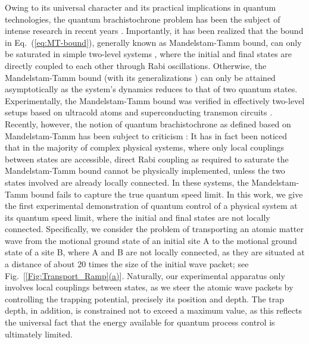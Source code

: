 \documentclass[aps,pra,reprint,a4paper,nofootinbib,superscriptaddress,numbers,longbibliography,showpacs,showkeys,floatfix]{revtex4-1}
\newcommand{\figref}[2]{\hyperref[#1]{\ref{#1}(#2)}} %
\newcommand{\MT}{Mandelstam-Tamm\xspace}
\begin{document}
Owing to its universal character and its practical implications in quantum technologies, the quantum brachistochrone problem has been the subject of intense research in recent years \cite{Deffner:2017a}.
%
Importantly, it has been realized that the bound in Eq.~(\ref{eq:MT-bound}), generally known as Mandelstam-Tamm bound, can only be saturated in simple two-level systems \cite{Uhlmann:2009}, where the initial and final states are directly coupled to each other through Rabi oscillations.
%
Otherwise, the \MT bound (with its generalizations \cite{Margolus:1998}) can only be attained asymptotically \cite{Levitin:2009} as the system's dynamics reduces to that of two quantum states.
%
Experimentally, the \MT bound was verified in effectively two-level setups based on ultracold atoms \cite{Bason:2012} and superconducting transmon circuits \cite{Vepsalainen:2019}.
%
Recently, however, the notion of quantum brachistochrone as defined based on \MT has 
been subject to criticism \cite{Bukov:2019}:
%
It has in fact been noticed that in the majority of complex physical systems, where only local couplings between states are accessible, direct Rabi coupling as required to saturate the \MT bound cannot be physically implemented, unless the two states involved are already locally connected.
%
In these systems, the \MT bound fails to capture the true quantum speed limit.
%
%
%
%
In this work, we give the first experimental demonstration of quantum control of a physical system at its quantum speed limit, where the initial and final states are not locally connected.
%
Specifically, we consider the problem of transporting an atomic matter wave from the motional ground state of an initial site A to the motional ground state of a site B, where A and B are not locally connected, as they are situated at a distance of about 20 times the size of the initial wave packet; see Fig.~[\figref{Fig:Transport_Ramp}{a}].
%
Naturally, our experimental apparatus only involves local couplings between states, as we steer the atomic wave packets by controlling the trapping potential, precisely its position and depth.
%
The trap depth, in addition, is constrained not to exceed a maximum value, as this reflects the universal fact that the energy available for quantum process control is ultimately limited.
%
%
\end{document}
